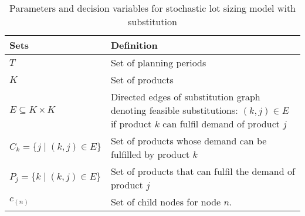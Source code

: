 \documentclass[10pt]{article}
\newcommand{\TI}{T}
\newcommand{\ka}{k} %
\newcommand{\KA}{K}
\newcommand{\jey}{j} %
\begin{document}
\begin{table}[H]
\centering
\caption{Parameters and decision variables for stochastic lot sizing model with substitution}
\begin{adjustbox}{width=1\textwidth,center=\textwidth}
\begin{tabular}{ll}
\toprule
{\bf Sets} & {\bf Definition} \\ \midrule
$\TI$  & Set of planning periods \\ 
$\KA$  & Set of products \\
$E \subseteq \KA \times \KA$  & Directed edges of substitution graph denoting feasible substitutions: $(k, j) \in E$ if product $\ka$  can fulfil demand of product $\jey$\\
$ C_{k} = \{j \mid (k,j) \in E\}$  & Set of products whose demand can be fulfilled by product $\ka$  \\
$ P_{j} = \{k \mid (k,j) \in E\}$  & Set of products that can fulfil the demand of product $j$ \\
$ c_(n) $  & Set of child nodes for node $n$. \\


\end{tabular}
\end{adjustbox}
\end{table}
\end{document}
